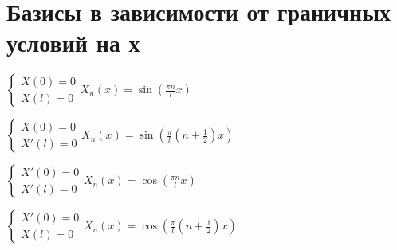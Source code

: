 \section*{Базисы в зависимости от граничных условий на х}
\begin{multicols}{2}
	$\begin{cases}
		X(0) = 0 \\
		X(l) = 0
	\end{cases} 
	X_n(x) = \sin(\frac{\pi n}{l}x)$

	\columnbreak

	$\begin{cases}
		X(0) = 0 \\
		X'(l) = 0
	\end{cases}
	X_n(x) = \sin(\frac{\pi}{l}(n + \frac{1}{2})x)$
\end{multicols}

\begin{multicols}{2}
	$\begin{cases}
		X'(0) = 0 \\
		X'(l) = 0
	\end{cases} 
	X_n(x) = \cos(\frac{\pi n}{l}x)$

	\columnbreak
	
	$\begin{cases}
		X'(0) = 0 \\
		X(l) = 0
	\end{cases}
	X_n(x) = \cos(\frac{\pi}{l}(n + \frac{1}{2})x)$
\end{multicols}
	
	
	
	
	
	
	
	